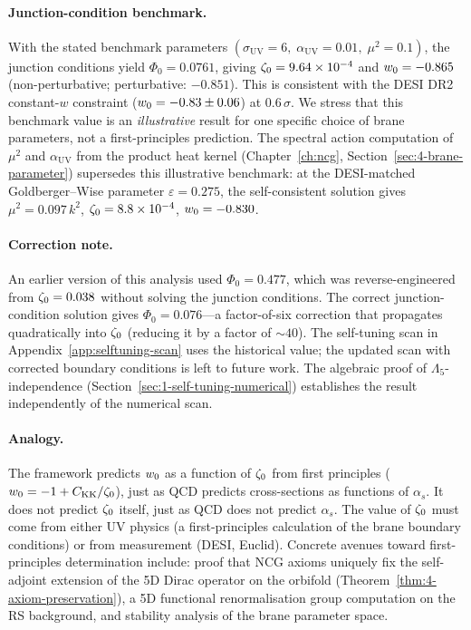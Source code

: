\paragraph{Junction-condition benchmark.} With the stated benchmark parameters $(\sigma_\mathrm{UV} = 6,\; \alpha_\mathrm{UV} = 0.01,\; \mu^2 = 0.1)$, the junction conditions yield $\Phi_0 = 0.0761$, giving $\zeta_0 = 9.64 \times 10^{-4}$ and $w_0 = -0.865$ (non-perturbative; perturbative: $-0.851$). This is consistent with the DESI DR2 constant-$w$ constraint ($w_0 = -0.83 \pm 0.06$) at $0.6\,\sigma$. We stress that this benchmark value is an \emph{illustrative} result for one specific choice of brane parameters, not a first-principles prediction. The spectral action computation of $\mu^2$ and $\alpha_{\mathrm{UV}}$ from the product heat kernel (Chapter~\ref{ch:ncg}, Section~\ref{sec:4-brane-parameter}) supersedes this illustrative benchmark: at the DESI-matched Goldberger--Wise parameter $\varepsilon = 0.275$, the self-consistent solution gives $\mu^2 = 0.097\,k^2$, $\zeta_0 = 8.8 \times 10^{-4}$, $w_0 = -0.830$.

\paragraph{Correction note.} An earlier version of this analysis used $\Phi_0 = 0.477$, which was reverse-engineered from $\zeta_0 = 0.038$ without solving the junction conditions. The correct junction-condition solution gives $\Phi_0 = 0.076$---a factor-of-six correction that propagates quadratically into $\zeta_0$ (reducing it by a factor of ${\sim}40$). The self-tuning scan in Appendix~\ref{app:selftuning-scan} uses the historical value; the updated scan with corrected boundary conditions is left to future work. The algebraic proof of $\Lambda_5$-independence (Section~\ref{sec:1-self-tuning-numerical}) establishes the result independently of the numerical scan.

\paragraph{Analogy.} The framework predicts $w_0$ as a function of $\zeta_0$ from first principles ($w_0 = -1 + C_{\mathrm{KK}}/\zeta_0$), just as QCD predicts cross-sections as functions of $\alpha_s$. It does not predict $\zeta_0$ itself, just as QCD does not predict $\alpha_s$. The value of $\zeta_0$ must come from either UV physics (a first-principles calculation of the brane boundary conditions) or from measurement (DESI, Euclid). Concrete avenues toward first-principles determination include: proof that NCG axioms uniquely fix the self-adjoint extension of the 5D Dirac operator on the orbifold (Theorem~\ref{thm:4-axiom-preservation}), a 5D functional renormalisation group computation on the RS background, and stability analysis of the brane parameter space.

